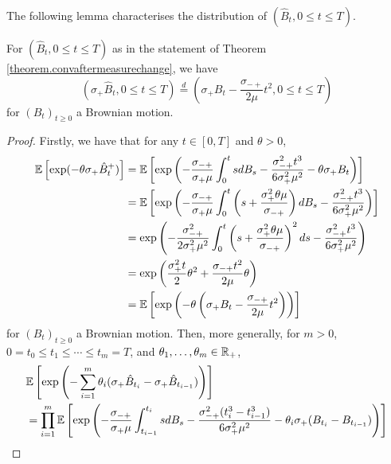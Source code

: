  The following lemma characterises the distribution of $(\hat{B}_t, {0\leq t\leq T})$.
 \begin{lemma}\label{lemma.characterizelimitprocess}
 For $(\hat{B}_t, {0\leq t\leq T})$ as in the statement of Theorem \ref{theorem.convaftermeasurechange}, we have  
 $$(\sigma_+ \hat{B}_t, {0\leq t\leq T})\overset{d}{=}\left(\sigma_+ B_t-\frac{\sigma_{-+}}{2\mu}t^2, {0\leq t\leq T}\right)$$
 for $(B_t)_{t\geq 0}$ a Brownian motion.
 \end{lemma}
 \begin{proof}
 Firstly, we have that for any $t\in [0,T]$ and $\theta>0$,
 \begin{align*} {\mathbb E}\left[\exp(-\theta \sigma_+ \hat{B}_t^+)\right] &= {\mathbb E} \left[ \exp\left(-\frac{\sigma_{-+}}{\sigma_+ \mu}\int_0^t s dB_s-\frac{\sigma_{-+}^2 t^3}{6\sigma_+^2\mu^2}-\theta\sigma_+ B_t  \right)\right]\\
 &={\mathbb E}\left[\exp \left( -\frac{\sigma_{-+}}{\sigma_+ \mu}\int_0^t \left(s+\frac{\sigma_+^2\theta \mu}{\sigma_{-+}}\right) dB_s -\frac{\sigma_{-+}^2 t^3}{6\sigma_+^2\mu^2}\right)\right] \\
 &= \exp\left(-\frac{\sigma_{-+}^2}{2\sigma_+^2 \mu^2}\int_0^t \left(s+\frac{\sigma_+^2\theta \mu}{\sigma_{-+}}\right)^2 ds -\frac{\sigma_{-+}^2 t^3}{6\sigma_+^2\mu^2}\right)\\
 &=\exp\left(\frac{\sigma_+^2 t}{2}\theta^2+\frac{\sigma_{-+} t^2}{2\mu}\theta \right)\\
 &= {\mathbb E} \left[\exp\left(-\theta\left(\sigma_+ B_t - \frac{\sigma_{-+}}{2\mu} t^2\right)\right)\right]
 \end{align*}
 for $(B_t)_{t\geq 0}$ a Brownian motion.
 Then, more generally, for $m>0$, $0=t_0\leq t_1\leq \cdots \leq t_m=T$, and $\theta_1, \dots, \theta_m \in {\mathbb R}_+$, 
 \begin{align*}
     &\E\left[\exp\left(-\sum_{i=1}^m \theta_i(\sigma_+\hat{B}_{t_i}-\sigma_+\hat{B}_{t_{i-1}})\right)\right]\\
     &= \prod_{i=1}^m \E\left[\exp\left(-\frac{\sigma_{-+}}{\sigma_+\mu} \int _{t_{i-1}}^{t_i} s dB_s-\frac{\sigma_{-+}^2 (t_i^3-t_{i-1}^3)}{6\sigma_+^2 \mu^2}-\theta_i \sigma_+  (B_{t_i}-B_{t_{i-1}})\right)\right]\\

\end{align*}
\end{proof}
